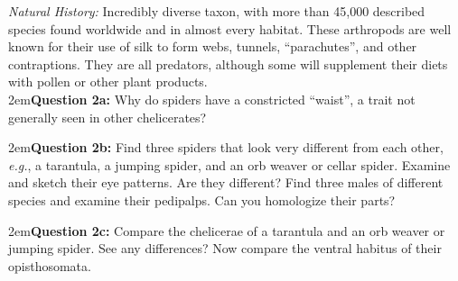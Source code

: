 \documentclass[letterpaper, 11pt]{article}
\begin{document}
\noindent{}\textit{Natural History:} Incredibly diverse taxon, with more than 45,000 described species found worldwide and in almost every habitat. These arthropods are well known for their use of silk to form webs, tunnels, ``parachutes'', and other contraptions. They are all predators, although some will supplement their diets with pollen or other plant products.\\

\hangindent2em\textbf{Question 2a:} Why do spiders have a constricted ``waist'', a trait not generally seen in other chelicerates? \vspace{2cm}

\hangindent2em\textbf{Question 2b:} Find three spiders that look very different from each other, \textit{e.g.}, a tarantula, a jumping spider, and an orb weaver or cellar spider. Examine and sketch their eye patterns. Are they different? Find three males of different species and examine their pedipalps. Can you homologize their parts?\vspace{2cm}

\hangindent2em\textbf{Question 2c:} Compare the chelicerae of a tarantula and an orb weaver or jumping spider. See any differences? Now compare the ventral habitus of their opisthosomata.\vspace{3cm}
\end{document}
